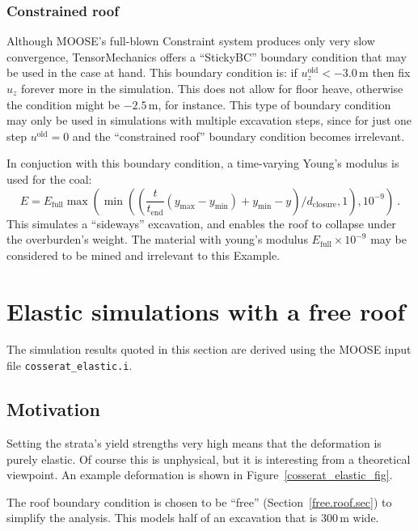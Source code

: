 \documentclass[]{scrreprt}
\begin{document}
\subsection{Constrained roof}
\label{sitckybc.defn.}

Although MOOSE's full-blown Constraint system produces only very slow
convergence, TensorMechanics offers a ``StickyBC'' boundary condition
that may be used in the case at hand.  This boundary condition is: if
$u_{z}^{\mathrm{old}}<-3.0$\,m then fix $u_{z}$ forever more in the simulation.  This
does not allow for floor heave, otherwise the condition might be
$-2.5$\,m, for instance.  This type of boundary condition may only be
used in simulations with multiple excavation steps, since for just one
step $u^{\mathrm{old}}=0$ and the ``constrained roof'' boundary
condition becomes irrelevant.

In conjuction with this boundary condition, a time-varying Young's
modulus is used for the coal:
\begin{equation}
E = E_{\mathrm{full}}\max\left( \min\left( \left(
\frac{t}{t_{\mathrm{end}}}(y_{\mathrm{max}} - y_{\mathrm{min}}) +
y_{\mathrm{min}} - y \right) / d_{\mathrm{closure}}, 1 \right),
10^{-9} \right) \ .
\end{equation}
This simulates a ``sideways'' excavation, and enables the roof to
collapse under the overburden's weight.  The material with young's
modulus $E_{\mathrm{full}}\times 10^{-9}$ may be considered to be
mined and irrelevant to this Example.


\chapter{Elastic simulations with a free roof}
\label{elastic.chap}

The simulation results quoted in this section are derived using the
MOOSE input file {\tt cosserat\_elastic.i}.

\section{Motivation}

Setting the strata's yield strengths very high means that the
deformation is purely elastic.  Of course this is unphysical, but it
is interesting from a theoretical viewpoint.  An example deformation
is shown in Figure~\ref{cosserat_elastic_fig}.

The roof boundary condition is chosen to be ``free''
(Section~\ref{free.roof.sec}) to simplify the analysis.  This models
half of an excavation that is 300\,m wide.
\end{document}
